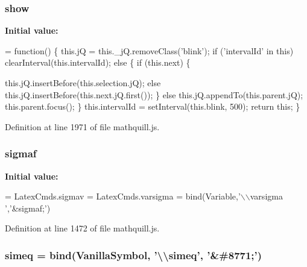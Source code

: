 \subsubsection[{show}]{\setlength{\rightskip}{0pt plus 5cm}{\bf \-\_\-} show}\label{mathquill_8js_aa33be9376653d632b48f30b1f0f99962}
{\bfseries Initial value\-:}
\begin{DoxyCode}
= \textcolor{keyword}{function}() \{
  this.jQ = this.\_jQ.removeClass(\textcolor{stringliteral}{'blink'});
  \textcolor{keywordflow}{if} (\textcolor{stringliteral}{'intervalId'} in \textcolor{keyword}{this}) 
    clearInterval(this.intervalId);
  \textcolor{keywordflow}{else} \{ 
    \textcolor{keywordflow}{if} (this.next) \{

        this.jQ.insertBefore(this.selection.jQ);
      \textcolor{keywordflow}{else}
        this.jQ.insertBefore(this.next.jQ.first());
    \}
    \textcolor{keywordflow}{else}
      this.jQ.appendTo(this.parent.jQ);
    this.parent.focus();
  \}
  this.intervalId = setInterval(this.blink, 500);
  \textcolor{keywordflow}{return} \textcolor{keyword}{this};
\}
\end{DoxyCode}


Definition at line 1971 of file mathquill.\-js.

\subsubsection[{sigmaf}]{ sigmaf}\label{mathquill_8js_ae4880a8aa2a3feb2bf5550d70589a574}
{\bfseries Initial value\-:}
\begin{DoxyCode}
= 
LatexCmds.sigmav = 
LatexCmds.varsigma = 
  bind(Variable,\textcolor{stringliteral}{'\(\backslash\)\(\backslash\)varsigma '},\textcolor{stringliteral}{'&sigmaf;'})
\end{DoxyCode}


Definition at line 1472 of file mathquill.\-js.

\subsubsection[{simeq}]{ simeq = {\bf bind}({\bf Vanilla\-Symbol}, '\textbackslash{}\textbackslash{}simeq', '\&\#8771;')}\label{mathquill_8js_a96ac4426ca454a55f16768ad95a1f7df}


